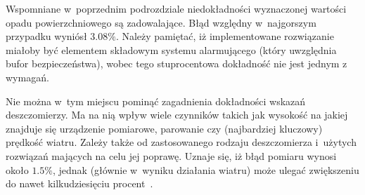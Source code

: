 Wspomniane w~poprzednim podrozdziale niedokładności wyznaczonej wartości opadu powierzchniowego są zadowalające. Błąd względny w~najgorszym przypadku wyniósł $3.08\%$. Należy pamiętać, iż implementowane rozwiązanie miałoby być elementem składowym systemu alarmującego (który uwzględnia bufor bezpieczeństwa), wobec tego stuprocentowa dokładność nie jest jednym z wymagań.

Nie można w~tym miejscu pominąć zagadnienia dokładności wskazań deszczomierzy. Ma na nią wpływ wiele czynników takich jak wysokość na jakiej znajduje się urządzenie pomiarowe, parowanie czy (najbardziej kluczowy) prędkość wiatru. Zależy także od zastosowanego rodzaju deszczomierza i~użytych rozwiązań mających na celu jej poprawę. Uznaje się, iż błąd pomiaru wynosi około $1.5\%$, jednak (głównie w~wyniku działania wiatru) może ulegać zwiększeniu do nawet kilkudziesięciu procent~\cite{precip_error}.